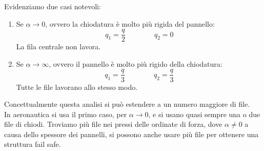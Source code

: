 Evidenziamo due casi notevoli:
\begin{enumerate}
    \item Se $\alpha \to0$, ovvero la chiodatura è molto più rigida del pannello:
    \begin{equation*}
        q_1=\frac{q}{2}  \qquad \qquad q_2=0
    \end{equation*}
    La fila centrale non lavora.\\
    \item Se $\alpha \to\infty$, ovvero il pannello è molto più rigido della chiodatura:
    \begin{equation*}
        q_1=\frac{q}{3}  \qquad \qquad q_2=\frac{q}{3} 
    \end{equation*}
    Tutte le file lavorano allo stesso modo.
\end{enumerate}
Concettualmente questa analisi si può estendere a un numero maggiore di file. \\
In aeronautica si usa il primo caso, per  $\alpha \to0$, e si usano quasi sempre una o due file di chiodi. Troviamo più file nei pressi delle ordinate di forza, dove $\alpha \neq0$ a causa dello spessore dei pannelli, si possono anche usare più file per ottenere una struttura fail safe.

